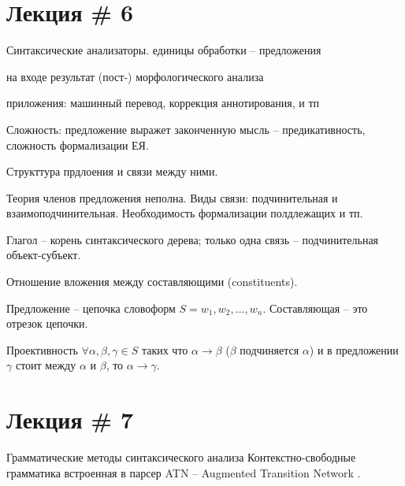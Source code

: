 \documentclass[a4paper]{article}
\newcommand{\eng}[1]{\foreignlanguage{english}{#1}}
\begin{document}
\section{Лекция \# 6} %
\label{sec:lecture_6}

Синтаксические анализаторы. единицы обработки -- предложения

на входе результат (пост-) морфологического анализа

приложения: машинный перевод, коррекция аннотирования, и тп

Сложность: предложение выражет законченную мысль -- предикативность, сложность формализации ЕЯ.

Структтура прдлоения и связи между ними.

Теория членов предложения неполна.
Виды связи: подчинительная и взаимоподчинительная. Необходимость формализации полдлежащих и тп.

Глагол -- корень синтаксического дерева; только одна связь -- подчинительная объект-субъект.

Отношение вложения между составляющими (\eng{constituents}).

Предложение -- цепочка словоформ $S = w_1, w_2, \ldots, w_n$. Составляющая -- это отрезок цепочки.

Проективность $\forall \alpha, \beta, \gamma \in S$ таких что $\alpha\to \beta$ ($\beta$ подчиняется $\alpha$) и в предложении $\gamma$ стоит между $\alpha$ и $\beta$, то $\alpha\to\gamma$.



\section{Лекция \# 7} %
\label{sec:lecture_7}

Грамматические методы синтаксического анализа
Контекстно-свободные грамматика встроенная в парсер
\eng{ATN} -- \eng{Augmented Transition Network}
.

\end{document}
